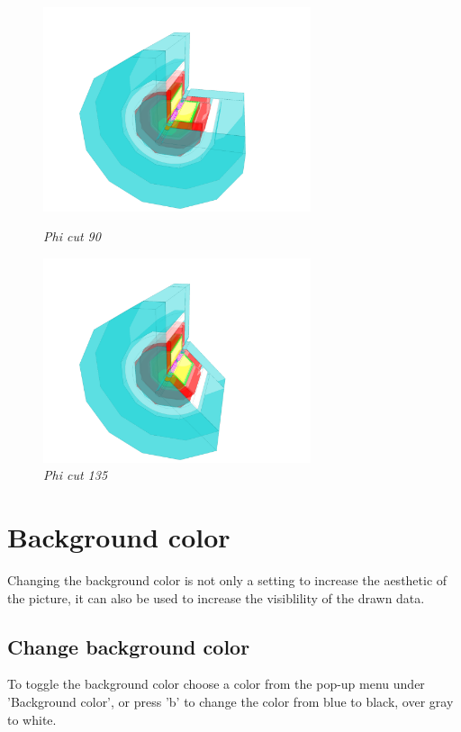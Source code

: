 \documentclass[a4paper,10pt]{article}
\begin{document}
\begin{figure}[h]
\begin{minipage}[t]{6cm}
\centerline{\includegraphics[height=6cm]{phi_cut_90.png}}
\caption{\label{CEDViewer} \textsl{Phi cut 90}}
\end{minipage}
\begin{minipage}[t]{6cm}
\setlength{\fboxsep}{0mm}
\centerline{\includegraphics[height=6cm]{phi_cut_135.png}}
\caption{\label{User viewer}\textsl{Phi cut 135}}
\end{minipage}

\end{figure}


\section{Background color}
Changing the background color is not only a setting to increase the aesthetic of the picture, it can also be used to increase the visiblility of the drawn data.
\subsection{Change background color}
To toggle the background color choose a color from the pop-up menu under 'Background color', or press 'b' to change the color from blue to black, over gray to white.
\end{document}
